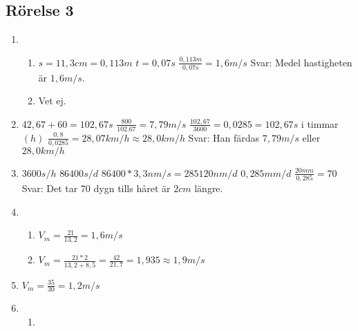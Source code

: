 \documentclass[a4paper,11pt]{article}
\begin{document}
\begin{flushleft}
\subsection{Rörelse 3}
\begin{enumerate}
  \item \begin{enumerate}
    \item $ s=11,3cm=0,113m $\newline
    $ t=0,07s $\newline
    $ \frac{0,113m}{0,07s}=1,6m/s $\newline
    Svar: Medel hastigheten är $ 1,6m/s $.
    \item Vet ej.
  \end{enumerate}
  \item $ 42,67+60=102,67s $\newline
  $ \frac{800}{102.67}=7,79m/s $\newline
  \newline
  $ \frac{102,67}{3600}=0,0285 = 102,67s $ i timmar$(h)$\newline
  \newline
  $ \frac{0,8}{0,0285}=28,07km/h\approx28,0km/h $\newline
  \newline
  Svar: Han färdas $ 7,79m/s $ eller $ 28,0km/h $
  
  
  \item $ 3600s/h $\newline
  $ 86400s/d $\newline
  $ 86400*3,3nm/s=285120nm/d $\newline
  $ 0,285mm/d $\newline
  $ \frac{20mm}{0,285}=70 $\newline
  Svar: Det tar 70 dygn tills håret är $2cm$ längre.
  \item \begin{enumerate}
    \item $ V_m=\frac{21}{13,2}=1,6m/s $\newline
    \item $ V_m=\frac{21*2}{13,2+8,5}=\frac{42}{21,7}=1,935\approx1,9m/s $\newline
  \end{enumerate}
  \item $ V_m=\frac{35}{30}=1,2m/s $
  \item \begin{enumerate}
    \item 
  \end{enumerate}
\end{enumerate}
\newpage

\end{flushleft}
\end{document}
